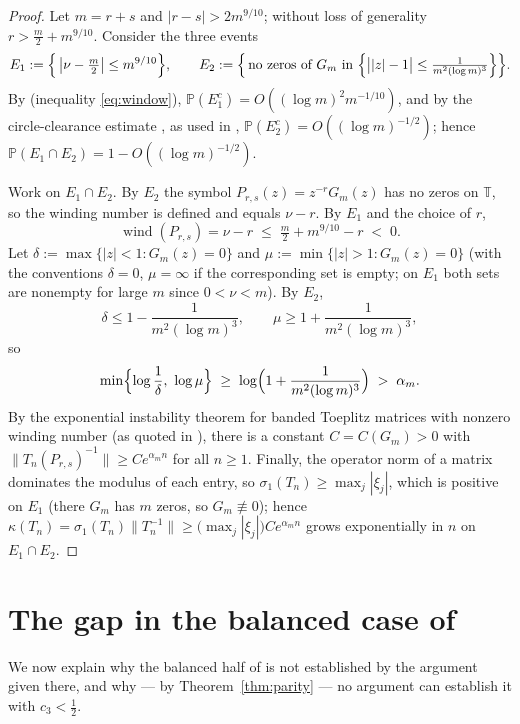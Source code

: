 \documentclass[11pt]{article}
\newcommand{\T}{\mathbb{T}}
\newcommand{\PP}{\mathbb{P}}
\newcommand{\wind}{\operatorname{wind}}
\begin{document}
\begin{proof}
Let $m=r+s$ and $|r-s|>2m^{9/10}$; without loss of generality
$r>\frac m2+m^{9/10}$.  Consider the three events
\[
E_1:=\Bigl\{\,\bigl|\nu-\tfrac m2\bigr|\le m^{9/10}\Bigr\},
\qquad
E_2:=\Bigl\{\,\text{no zeros of }G_m\text{ in }
\Bigl\{\bigl||z|-1\bigr|\le\tfrac{1}{m^{2}(\log m)^{3}}\Bigr\}\Bigr\}.
\]
By \cite[Theorem~3.1]{Manrique} (inequality \eqref{eq:window}),
$\PP(E_1^c)=O((\log m)^2m^{-1/10})$, and by the circle-clearance estimate
\cite[Theorem~1.1]{KMS}, as used in \cite[Section~2]{Manrique},
$\PP(E_2^c)=O((\log m)^{-1/2})$; hence
$\PP(E_1\cap E_2)=1-O((\log m)^{-1/2})$.

Work on $E_1\cap E_2$.  By $E_2$ the symbol $P_{r,s}(z)=z^{-r}G_m(z)$ has no
zeros on $\T$, so the winding number is defined and equals $\nu-r$.  By $E_1$
and the choice of $r$,
\[
\wind(P_{r,s})=\nu-r\;\le\;\tfrac m2+m^{9/10}-r\;<\;0 .
\]
Let $\delta:=\max\{|z|<1:G_m(z)=0\}$ and $\mu:=\min\{|z|>1:G_m(z)=0\}$ (with the
conventions $\delta=0$, $\mu=\infty$ if the corresponding set is empty; on
$E_1$ both sets are nonempty for large $m$ since $0<\nu<m$).  By $E_2$,
\[
\delta\le1-\frac{1}{m^2(\log m)^3},
\qquad
\mu\ge1+\frac{1}{m^2(\log m)^3},
\]
so
\[
\min\Bigl\{\log\frac1\delta,\ \log\mu\Bigr\}
\;\ge\;\log\Bigl(1+\frac{1}{m^{2}(\log m)^{3}}\Bigr)
\;>\;\alpha_m .
\]
By the exponential instability theorem for banded Toeplitz matrices with nonzero
winding number \cite[Theorem~4.1]{BG} (as quoted in
\cite[Section~1]{Manrique}), there is a constant $C=C(G_m)>0$ with
$\|T_n(P_{r,s})^{-1}\|\ge Ce^{\alpha_mn}$ for all $n\ge1$.  Finally, the
operator norm of a matrix dominates the modulus of each entry, so
$\sigma_1(T_n)\ge\max_{j}|\xi_j|$, which is positive on $E_1$ (there $G_m$ has
$m$ zeros, so $G_m\not\equiv0$); hence
$\kappa(T_n)=\sigma_1(T_n)\|T_n^{-1}\|\ge\bigl(\max_j|\xi_j|\bigr)Ce^{\alpha_mn}$
grows exponentially in $n$ on $E_1\cap E_2$.
\end{proof}

\section{The gap in the balanced case of \cite{Manrique}}\label{sec:gap}

We now explain why the balanced half of \cite[Theorem~2.1]{Manrique} is not
established by the argument given there, and why --- by
Theorem~\ref{thm:parity} --- no argument can establish it with
$c_3<\tfrac12$.
\end{document}
